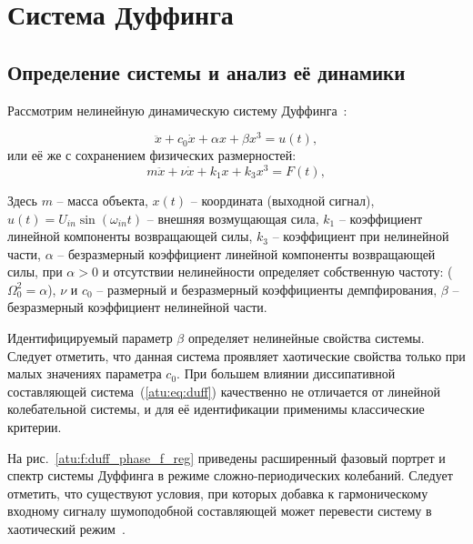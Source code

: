 
\FloatBarrier

\section{Система Дуффинга} %
\label{atu:sect:duff}


\subsection{Определение системы и анализ её динамики} %

Рассмотрим нелинейную динамическую систему Дуффинга~\cite{magni_theory_dyn_chaos,atu_asau12}:

\begin{equation}
 \ddot{x} + c_0 \dot{x} + \alpha x + \beta x^3 = u(t) ,
\label{atu:eq:duff}
\end{equation}
%
или её же с сохранением физических размерностей:
%
\begin{equation}
 m \ddot{x} + \nu \dot{x} + k_1 x + k_3 x^3 = F(t) ,
\label{atu:eq:duff_phys}
\end{equation}

Здесь $m$ -- масса объекта,
$x(t)$ -- координата (выходной сигнал),
$u(t) = U_{in} \sin( \omega_{in} t ) $ -- внешняя возмущающая сила,
$ k_1 $ -- коэффициент линейной компоненты возвращающей силы,
$ k_3 $ -- коэффициент при нелинейной части,
$ \alpha $ -- безразмерный коэффициент линейной компоненты возвращающей силы,
 при $ \alpha >0 $ и отсутствии нелинейности определяет собственную частоту: ($\Omega_0^2 = \alpha $),
$ \nu $ и $ c_0$ -- размерный и безразмерный коэффициенты демпфирования,
$ \beta $ -- безразмерный коэффициент нелинейной части.

Идентифицируемый параметр $ \beta $ определяет нелинейные свойства системы.
Следует отметить, что  данная система проявляет хаотические свойства
только при малых значениях параметра \(c_0\). При большем
влиянии диссипативной составляющей система~(\ref{atu:eq:duff}) качественно
не отличается от линейной колебательной системы,
и для её идентификации применимы классические критерии.


На рис.~\ref{atu:f:duff_phase_f_reg} приведены
расширенный фазовый портрет и спектр системы Дуффинга
в режиме сложно-периодических колебаний.
Следует отметить, что существуют условия, при которых добавка к гармоническому входному сигналу
шумоподобной составляющей может перевести систему в хаотический режим~\cite{atu_asau15}.

